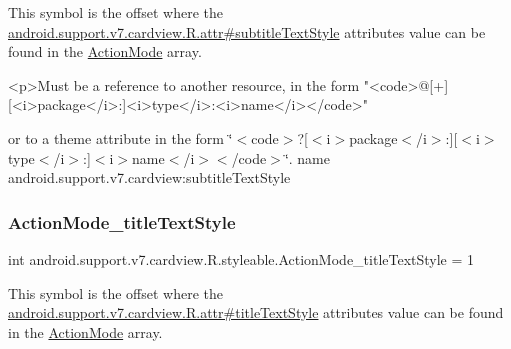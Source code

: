 This symbol is the offset where the \hyperlink{classandroid_1_1support_1_1v7_1_1cardview_1_1R_1_1attr_ab76882e8855338c32b6fe8ee7b986537}{android.\+support.\+v7.\+cardview.\+R.\+attr\#subtitle\+Text\+Style} attribute\textquotesingle{}s value can be found in the \hyperlink{classandroid_1_1support_1_1v7_1_1cardview_1_1R_1_1styleable_aadab2db6f0b961c9bad3b28abb49a9b0}{Action\+Mode} array.

\begin{DoxyVerb}      <p>Must be a reference to another resource, in the form "<code>@[+][<i>package</i>:]<i>type</i>:<i>name</i></code>"
\end{DoxyVerb}
 or to a theme attribute in the form \char`\"{}$<$code$>$?\mbox{[}$<$i$>$package$<$/i$>$\+:\mbox{]}\mbox{[}$<$i$>$type$<$/i$>$\+:\mbox{]}$<$i$>$name$<$/i$>$$<$/code$>$\char`\"{}.  name android.\+support.\+v7.\+cardview\+:subtitle\+Text\+Style \mbox{\label{classandroid_1_1support_1_1v7_1_1cardview_1_1R_1_1styleable_a92d5caac9795b056f4da8a56c8588ee3}} 
\subsubsection{\texorpdfstring{Action\+Mode\+\_\+title\+Text\+Style}{ActionMode\_titleTextStyle}}
{\footnotesize\ttfamily int android.\+support.\+v7.\+cardview.\+R.\+styleable.\+Action\+Mode\+\_\+title\+Text\+Style = 1\hspace{0.3cm}{\ttfamily [static]}}

This symbol is the offset where the \hyperlink{classandroid_1_1support_1_1v7_1_1cardview_1_1R_1_1attr_a51262633643c8f1e23f18798bc06f662}{android.\+support.\+v7.\+cardview.\+R.\+attr\#title\+Text\+Style} attribute\textquotesingle{}s value can be found in the \hyperlink{classandroid_1_1support_1_1v7_1_1cardview_1_1R_1_1styleable_aadab2db6f0b961c9bad3b28abb49a9b0}{Action\+Mode} array.

